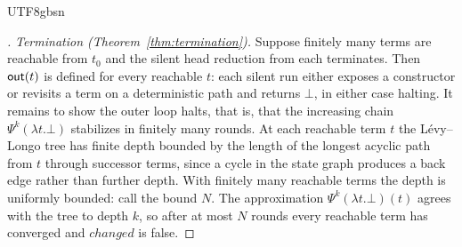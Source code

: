\begin{CJK*}{UTF8}{gbsn}
\begin{proof}[]
    \emph{Termination (Theorem~\ref{thm:termination}).} Suppose finitely many terms are reachable from $t_0$ and the silent head reduction from each terminates. Then $\mathsf{out}(t)$ is defined for every reachable $t$: each silent run either exposes a constructor or revisits a term on a deterministic path and returns $\bot$, in either case halting. It remains to show the outer loop halts, that is, that the increasing chain $\Psi^k(\lambda t.\bot)$ stabilizes in finitely many rounds. At each reachable term $t$ the L\'evy--Longo tree has finite depth bounded by the length of the longest acyclic path from $t$ through successor terms, since a cycle in the state graph produces a back edge rather than further depth. With finitely many reachable terms the depth is uniformly bounded: call the bound $N$. The approximation $\Psi^k(\lambda t.\bot)(t)$ agrees with the tree to depth $k$, so after at most $N$ rounds every reachable term has converged and $\mathit{changed}$ is false.
    \fi
  \end{proof}


\end{CJK*}
